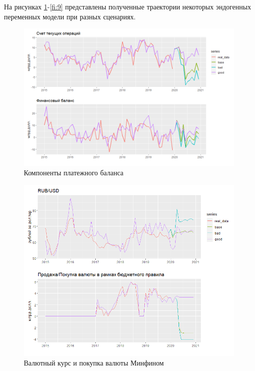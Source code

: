 \documentclass[a4paper, 14pt]{extarticle}
\begin{document}
На рисунках \ref{fi:7}-\ref{fi:9} представлены полученные траектории некоторых эндогенных переменных модели при разных сценариях.

\begin{figure}[htp]
	\centering
	\includegraphics[width=18cm]{cur_2015.png}
	\caption{Компоненты платежного баланса}\label{fi:7}
\end{figure}

\begin{figure}[htp]
	\centering
	\includegraphics[width=18cm]{rub_2015.png}
	\caption{Валютный курс и покупка валюты Минфином}\label{fi:8}
\end{figure}
\end{document}
